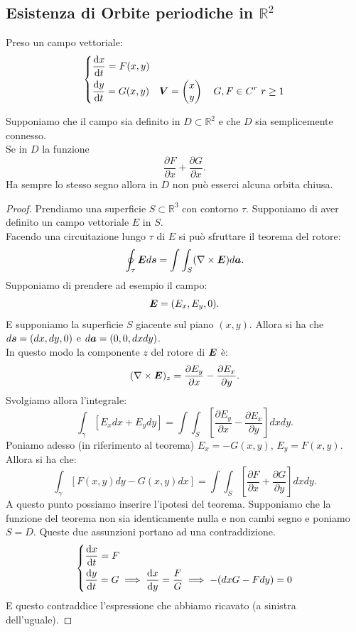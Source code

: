 \subsection{Esistenza di Orbite periodiche in $\mathbb{R}^2$}%
\label{sub:Esistenza di Orbite periodiche in} 
Preso un campo vettoriale:
\[
\begin{dcases}
    \frac{\text{d} x}{\text{d} t} = F(x, y) \\
    \frac{\text{d} y}{\text{d} t} = G(x, y) 
    \quad  \boldsymbol{V} = \begin{pmatrix} x \\ y \end{pmatrix} \quad 
    G, F \in C^r \ r\ge 1
\end{dcases}
\]
\begin{thm}
    Supponiamo che il campo sia definito in $D \subset \mathbb{R}^2$  e che $D$  sia semplicemente connesso.\\
    Se in $D$  la funzione 
    \[
        \frac{\partial F}{\partial x} + \frac{\partial G}{\partial x} 
    .\] 
    Ha sempre lo stesso segno allora in $D$ non può esserci alcuna orbita chiusa.
\end{thm}
\noindent
\begin{proof}
    Prendiamo una superficie $S \subset \mathbb{R}^3$ con contorno $\tau$. Supponiamo di aver definito un campo vettoriale $E$ in $S$.\\
    Facendo una circuitazione lungo $\tau$ di $E$ si può sfruttare il teorema del rotore:
    \[
	\oint_{\tau} \boldsymbol{E}d\boldsymbol{s} = \int \int_S (\nabla \times \boldsymbol{E}) d\boldsymbol{a}
    .\] 
    Supponiamo di prendere ad esempio il campo:
    \[
	\boldsymbol{E} = (E_x, E_y, 0)
    .\] 
    E supponiamo la superficie $S$ giacente sul piano $(x, y)$. Allora si ha che $d\boldsymbol{s} = (dx, dy, 0) $ e $d\boldsymbol{a} = (0 , 0, dxdy) $.\\
    In questo modo la componente $z$ del rotore di $\boldsymbol{E}$ è:
    \[
	(\nabla \times \boldsymbol{E})_z = \frac{\partial E_y}{\partial x} - \frac{\partial E_x}{\partial y} 
    .\] 
    Svolgiamo allora l'integrale:
    \[
        \int_\gamma  \left[E_x dx + E_ydy\right] = \int \int_S \left[\frac{\partial E_y}{\partial x} - \frac{\partial E_x}{\partial y} \right]dxdy
    .\] 
    Poniamo adesso (in riferimento al teorema) $E_x = -G(x, y)$, $E_y = F(x, y) $. Allora si ha che:
    \[
	\int_\gamma  \left[F(x, y) dy - G(x, y) dx\right] = 
	\int \int_S \left[\frac{\partial F}{\partial x} + \frac{\partial G}{\partial y} \right]dxdy
    .\] 
    A questo punto possiamo inserire l'ipotesi del teorema. Supponiamo che la funzione del teorema non sia identicamente nulla e non cambi segno e poniamo $S = D$. Queste due assunzioni portano ad una contraddizione.
    \[
    \begin{dcases}
    \frac{\text{d} x}{\text{d} t} = F\\
    \frac{\text{d} y}{\text{d} t} = G 
    \implies  \frac{\text{d} x}{\text{d} y} = \frac{F}{G}\implies 
    -(dxG-Fdy) = 0
    \end{dcases}
    \]
    E questo contraddice l'espressione che abbiamo ricavato (a sinistra dell'uguale).
\end{proof}
